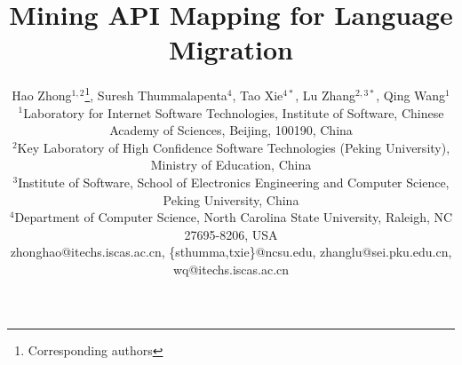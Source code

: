 \documentclass{sig-alternate}
\begin{document}


\title{Mining API Mapping for Language Migration}

\author{
Hao Zhong$^{1,2}$\thanks{Corresponding authors}, Suresh Thummalapenta$^4$, Tao Xie$^{4*}$, Lu Zhang$^{2,3*}$, Qing Wang$^{1}$\\
\small{$^1$Laboratory for Internet Software Technologies, Institute of Software, Chinese Academy of Sciences, Beijing, 100190, China}\\
\small{$^2$Key Laboratory of High Confidence Software Technologies (Peking University), Ministry of Education, China}\\
\small{$^3$Institute of Software, School of Electronics Engineering and Computer Science, Peking University, China} \\
\small{$^4$Department of Computer Science, North Carolina State University, Raleigh, NC 27695-8206, USA}\\
\small{zhonghao@itechs.iscas.ac.cn, \{sthumma,txie\}@ncsu.edu,
zhanglu@sei.pku.edu.cn, wq@itechs.iscas.ac.cn}}

\maketitle
\thispagestyle{empty}
\end{document}
